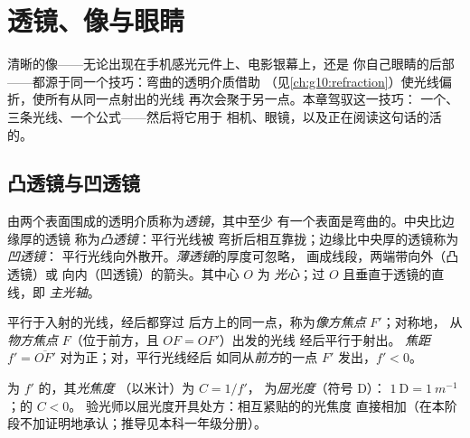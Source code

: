 \chapter{透镜、像与眼睛}\label{ch:g11:lenses-and-eye}

清晰的像——无论出现在手机感光元件上、电影银幕上，还是
你自己眼睛的后部——都源于同一个技巧：弯曲的透明介质借助
（见\cref{ch:g10:refraction}）使光线偏折，使所有从同一点射出的光线
再次会聚于另一点。本章驾驭这一技巧：
一个、三条光线、一个公式——然后将它用于
相机、眼镜，以及正在阅读这句话的活的。

\section{凸透镜与凹透镜}

\begin{definition}[薄透镜]\label{def:g11:lenses-and-eye:lens}
由两个表面围成的透明介质称为\emph{透镜}，其中至少
有一个表面是弯曲的。中央比边缘厚的透镜
称为\emph{凸透镜}：平行光线被
弯折后相互靠拢；边缘比中央厚的透镜称为\emph{凹透镜}：
平行光线向外散开。\emph{薄透镜}的厚度可忽略，
画成线段，两端带向外（凸透镜）或
向内（凹透镜）的箭头。其中心 $O$ 为
\emph{光心}；过 $O$ 且垂直于透镜的直线，即
\emph{主光轴}。
\end{definition}

\begin{definition}[焦点与焦距]\label{def:g11:lenses-and-eye:focal}
平行于入射的光线，经后都穿过
后方上的同一点，称为\emph{像方焦点} $F'$；对称地，
从\emph{物方焦点} $F$（位于前方，且 $OF = OF'$）出发的光线
经后平行于射出。
\emph{焦距} $f' = \overline{OF'}$
对为正；对，平行光线经后
如同从\emph{前方}的一点 $F'$ 发出，$f' < 0$。
\end{definition}

\begin{definition}[光焦度]\label{def:g11:lenses-and-eye:vergence}
为 $f'$ 的，其\emph{光焦度}
（以米计）为 $C = 1/f'$，
为\emph{屈光度}（符号 D）：
$1~\text{D} = \qty{1}{m^{-1}}$；的 $C < 0$。
验光师以屈光度开具处方：相互紧贴的的光焦度
直接相加（在本阶段不加证明地承认；推导见本科一年级分册）。
\end{definition}

